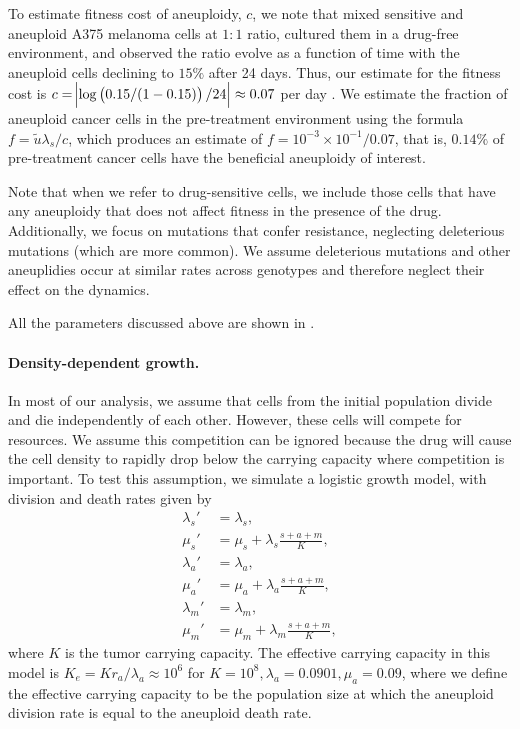 \documentclass[12pt]{extarticle}
\renewcommand{\Delta}{r}
\begin{document}
To estimate fitness cost of aneuploidy, $c$, we note that \citet{lukow2021chromosomal} mixed sensitive and aneuploid A375 melanoma cells at $1:1$ ratio, cultured them in a drug-free environment, and observed the ratio evolve as a function of time with the aneuploid cells declining to $15\%$ after 24 days. Thus, our estimate for the fitness cost is $c=\abs{\log\left(0.15/(1-0.15)\right)/24}\approx0.07$ per day \citep{chevin2011measuring}.
We estimate the fraction of aneuploid cancer cells in the pre-treatment environment using the formula $f=\tilde{u}\lambda_s / c$, which produces an estimate of $f=10^{-3}\times10^{-1}/0.07$, that is, $0.14\%$ of pre-treatment cancer cells have the beneficial aneuploidy of interest. %

Note that when we refer to drug-sensitive cells, we include those cells that have any aneuploidy that does not affect fitness in the presence of the drug. Additionally, we focus on mutations that confer resistance, neglecting deleterious mutations (which are more common). We assume deleterious mutations and other aneuplidies occur at similar rates across genotypes and therefore neglect their effect on the dynamics.

All the parameters discussed above are shown in .



\paragraph{Density-dependent growth.}

In most of our analysis, we assume that cells from the initial population divide and die independently of each other. 
However, these cells will compete for resources. 
We assume this competition can be ignored because the drug will cause the cell density to rapidly drop below the carrying capacity where competition is important.
To test this assumption, we simulate a logistic growth model, with division and death rates given by
\[
\begin{aligned}
\lambda_s' &= \lambda_s , \\
\mu_s' &= \mu_s + \lambda_s\frac{s+a+m}{K},\\
\lambda_a' &= \lambda_a ,\\ 
\mu_a' &= \mu_a + \lambda_a\frac{s+a+m}{K} ,\\
\lambda_m' &= \lambda_m ,\\ 
\mu_m' &= \mu_m + \lambda_m\frac{s+a+m}{K} ,
\end{aligned}
\]
where $K$ is the tumor carrying capacity. 
The effective carrying capacity in this model is $K_e=K\Delta_a/\lambda_a\approx10^6$ for $K=10^8, \lambda_a=0.0901,\mu_a=0.09$, where we define the effective carrying capacity to be the population size at which the aneuploid division rate is equal to the aneuploid death rate. 
\end{document}
